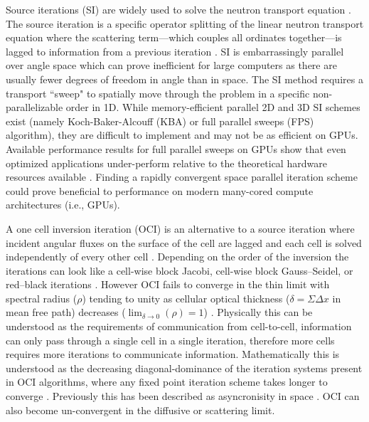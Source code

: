 Source iterations (SI) are widely used to solve the \sn neutron transport equation \cite{adams_fast_2002}.
The source iteration is a specific operator splitting of the linear neutron transport equation where the scattering term---which couples all \sn ordinates together---is lagged to information from a previous iteration \cite{lewis_computational_1984}.
SI is embarrassingly parallel over angle space which can prove inefficient for large computers as there are usually fewer degrees of freedom in angle than in space.
The SI method requires a transport ``sweep" to spatially move through the problem in a specific non-parallelizable order in 1D.
While memory-efficient parallel 2D and 3D SI schemes exist (namely Koch-Baker-Alcouff (KBA) or full parallel sweeps (FPS) \cite{baker_computational_2017, baker_kba_2017} algorithm), they are difficult to implement and may not be as efficient on GPUs.
Available performance results for full parallel sweeps on GPUs show that even optimized applications under-perform relative to the theoretical hardware resources available \cite{Thomas_2024_profiling, wolfe2022roofline, kunen_kripke_2015, zerr_partisn_2019}.
Finding a rapidly convergent space parallel iteration scheme could prove beneficial to performance on modern many-cored compute architectures (i.e., GPUs).

A one cell inversion iteration (OCI) is an alternative to a source iteration where incident angular fluxes on the surface of the cell are lagged and each cell is solved independently of every other cell \cite{rosa_cellwise_2013, adams_fast_2002}.
Depending on the order of the inversion the iterations can look like a cell-wise block Jacobi, cell-wise block Gauss--Seidel, or red--black iterations \cite{man1994parallel}.
However OCI fails to converge in the thin limit with spectral radius ($\rho$) tending to unity as cellular optical thickness ($\delta=\Sigma\Delta x$ in mean free path) decreases ($\lim_{\delta\rightarrow0}(\rho) = 1$) \cite{tsa_slab2006rosa}.
Physically this can be understood as the requirements of communication from cell-to-cell, information can only pass through a single cell in a single iteration, therefore more cells requires more iterations to communicate information.
Mathematically this is understood as the decreasing diagonal-dominance of the iteration systems present in OCI algorithms, where any fixed point iteration scheme takes longer to converge \cite{isaacson_numerical_1966}.
Previously this has been described as asyncronisity in space \cite{hoagland_hybrid_2021}.
OCI can also become un-convergent in the diffusive or scattering limit.

